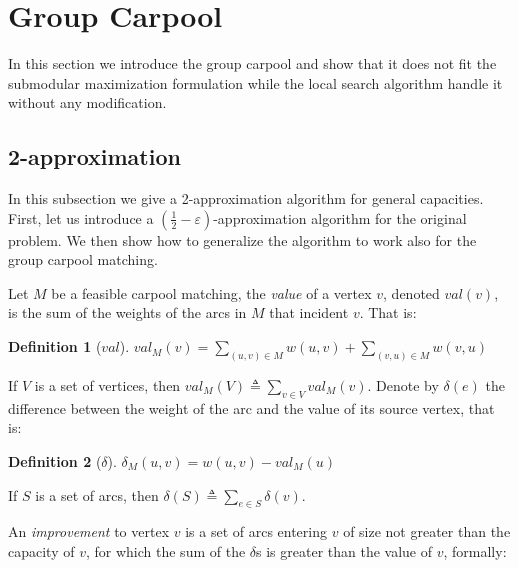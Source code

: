 \documentclass[draft]{article}
\newtheorem{definition}{Definition}
\begin{document}



\section{Group Carpool}
\label{sec:group}
In this section we introduce the group carpool and show that it does not fit the
submodular maximization formulation while the local search algorithm handle it
without any modification.

\subsection{2-approximation}
In this subsection we give a 2-approximation algorithm for general capacities.
First, let us introduce a $(\frac{1}{2} - \varepsilon)$-approximation algorithm
for the original problem.
We then show how to generalize the algorithm to work also for the group carpool
matching.


Let $M$ be a feasible carpool matching,
the \emph{value} of a vertex $v$, denoted $val(v)$, 
is the sum of the weights of the arcs in $M$ that incident $v$. 
That is: 
%
\begin{definition}[$val$]
$val_M(v) = \sum_{(u, v) \in M} w(u, v) + \sum_{(v, u) \in M} w(v, u)$
\end{definition}
%
If $V$ is a set of vertices, then $val_M(V) \triangleq \sum_{v \in V} val_M(v)$.
%
Denote by $\delta(e)$ the difference between the weight of the arc and the value
of its source vertex,
that is:
%
\begin{definition}[$\delta$]
$\delta_M(u, v) = w(u, v) - val_M(u)$
\end{definition}
%
If $S$ is a set of arcs, then $\delta(S) \triangleq \sum_{e \in S}\delta(v)$.

An \emph{improvement} to vertex $v$ 
is a set of arcs entering $v$ of size not greater than the capacity of $v$, 
for which the sum of the $\delta$s is greater than the value of $v$,
formally: 
\end{document}

